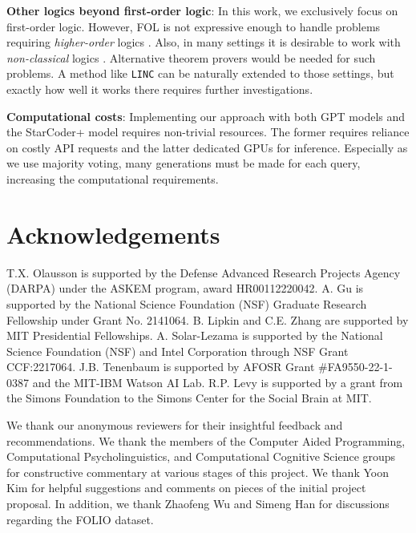 \documentclass[11pt]{article}
\begin{document}
\textbf{Other logics beyond first-order logic}: In this work, we exclusively focus on first-order logic. However, FOL is not expressive enough to handle problems requiring \textit{higher-order} logics \cite{miller1986some, higginbotham1998higher}. Also, in many settings it is desirable to work with \textit{non-classical} logics \cite{priest2008introduction, burgess2009philosophical}. Alternative theorem provers would be needed for such problems. A method like \texttt{LINC} can be naturally extended to those settings, but exactly how well it works there requires further investigations.

\textbf{Computational costs}: Implementing our approach with both GPT models and the StarCoder+ model requires non-trivial resources. The former requires reliance on costly API requests and the latter dedicated GPUs for inference. Especially as we use majority voting, many generations must be made for each query, increasing the computational requirements.


\section{Acknowledgements}
T.X. Olausson is supported by the Defense Advanced Research Projects Agency (DARPA) under the ASKEM program, award HR00112220042.
A. Gu is supported by the National Science Foundation (NSF) Graduate Research Fellowship under Grant No. 2141064. 
B. Lipkin and C.E. Zhang are supported by MIT Presidential Fellowships.
A. Solar-Lezama is supported by the National Science Foundation (NSF) and Intel Corporation through NSF Grant CCF:2217064.
J.B. Tenenbaum is supported by AFOSR Grant \#FA9550-22-1-0387 and the MIT-IBM Watson AI Lab.
R.P. Levy is supported by a grant from the Simons Foundation to the Simons Center for the Social Brain at MIT.

We thank our anonymous reviewers for their insightful feedback and recommendations.
We thank the members of the Computer Aided Programming, Computational Psycholinguistics, and Computational Cognitive Science groups for constructive commentary at various stages of this project. 
We thank Yoon Kim for helpful suggestions and comments on pieces of the initial project proposal.
In addition, we thank Zhaofeng Wu and Simeng Han for discussions regarding the FOLIO dataset.




\appendix

\end{document}
